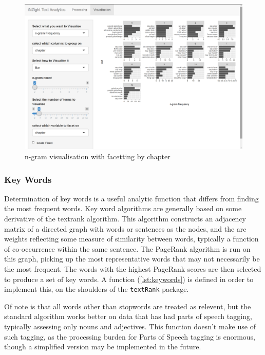 \documentclass[11pt, a4paper, twoside, titlepage]{report}
\begin{document}
\begin{figure}
\centering
\includegraphics[scale=0.35]{visualisation-n-gram-facet.png}
\caption{n-gram visualisation with facetting by chapter\label{fig:visualisation-n-gram-facet}}
\end{figure}

\subsubsection{Key Words}\label{sec:key-words}

Determination of key words is a useful analytic function that differs
from finding the most frequent words. Key word algorithms are
generally based on some derivative of the textrank algorithm. This
algorithm constructs an adjacency matrix of a directed graph with
words or sentences as the nodes, and the arc weights reflecting some
measure of similarity between words, typically a function of
co-occurrence within the same sentence. The PageRank algorithm is run
on this graph, picking up the most representative words that may not
necessarily be the most frequent. The words with the highest PageRank
scores are then selected to produce a set of key words. A function
(\cref{lst:keywords}) is defined in order to implement this, on the
shoulders of the \texttt{textRank}
package\autocite{wijffels19}.

Of note is that all words other than stopwords are treated as
relevent, but the standard algorithm works better on data that has had
parts of speech tagging, typically assessing only nouns and
adjectives. This function doesn't make use of such tagging, as the
processing burden for Parts of Speech tagging is enormous, though a
simplified version may be implemented in the future.
\end{document}
